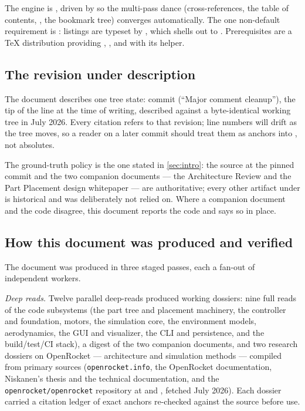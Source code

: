 The engine is , driven by  so the multi-pass dance
(cross-references, the table of contents, , the bookmark tree) converges
automatically. The one non-default requirement is : listings are
typeset by , which shells out to . Prerequisites are a
\TeX{} distribution providing , , and  with its
 helper.

\subsection{The revision under description}

The document describes one tree state: commit  (``Major comment
cleanup''), the tip of the  line at the time of writing, described
against a byte-identical working tree in July 2026. Every 
citation refers to that revision; line numbers will drift as the tree moves, so a reader
on a later commit should treat them as anchors into , not absolutes.

The ground-truth policy is the one stated in \cref{sec:intro}: the source at the pinned
commit and the two companion documents --- the Architecture Review and the Part Placement
design whitepaper --- are authoritative; every other artifact under  is
historical and was deliberately not relied on. Where a companion document and the code
disagree, this document reports the code and says so in place.

\subsection{How this document was produced and verified}

The document was produced in three staged passes, each a fan-out of independent
workers.

\emph{Deep reads.} Twelve parallel deep-reads produced working dossiers: nine full reads
of the code subsystems (the part tree and placement machinery, the controller and
 foundation, motors, the simulation core, the environment models,
aerodynamics, the GUI and visualizer, the CLI and persistence, and the build/test/CI
stack), a digest of the two companion documents, and two research dossiers on OpenRocket
--- architecture and simulation methods --- compiled from primary sources
(\texttt{openrocket.info}, the OpenRocket documentation, Niskanen's thesis and the
technical documentation, and the \texttt{openrocket/openrocket} repository at
 and , fetched July 2026). Each dossier carried a
citation ledger of exact  anchors re-checked against the source before
use.

